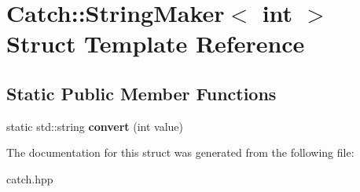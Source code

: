 \hypertarget{structCatch_1_1StringMaker_3_01int_01_4}{}\section{Catch\+::String\+Maker$<$ int $>$ Struct Template Reference}
\label{structCatch_1_1StringMaker_3_01int_01_4}
\subsection*{Static Public Member Functions}
\begin{DoxyCompactItemize}
\item 
\mbox{\label{structCatch_1_1StringMaker_3_01int_01_4_aab096e55fb7283f6ad47b5ca277e22e8}} 
static std\+::string {\bfseries convert} (int value)
\end{DoxyCompactItemize}


The documentation for this struct was generated from the following file\+:\begin{DoxyCompactItemize}
\item 
catch.\+hpp\end{DoxyCompactItemize}
